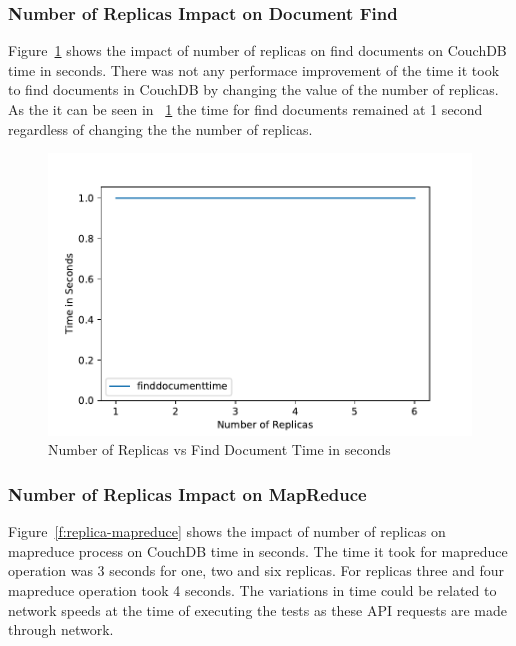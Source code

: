 \subsubsection{Number of Replicas Impact on Document Find}


Figure~\ref{f:replica-find} shows the impact of number of replicas on find
documents on CouchDB time in seconds. There was not any performace
improvement of the time it took to find documents in CouchDB  by
changing the value of the number of replicas. As the it can be seen in
~\ref{f:replica-find} the time for find documents remained at 1 second
regardless of changing the the number of replicas.

\begin{figure}[!ht]
  \centering\includegraphics[width=\columnwidth]{../images/ReplicasFindDoc.pdf}
  \caption{Number of Replicas vs Find Document Time in seconds }\label{f:replica-find}
\end{figure}

\subsubsection{Number of Replicas Impact on MapReduce}


Figure~\ref{f:replica-mapreduce} shows the impact of number of replicas on
mapreduce process on CouchDB time in seconds. The time it took for
mapreduce operation was 3 seconds for one, two and six replicas. For
replicas three and four mapreduce operation took 4 seconds. The
variations in time could be related to network speeds at the time of
executing the tests as these API requests are made through network. 

